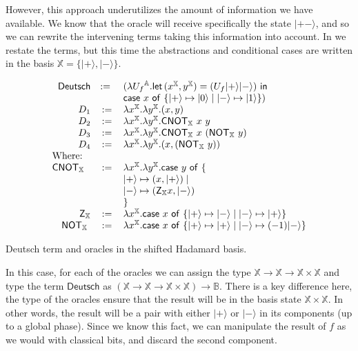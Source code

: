 \documentclass[runningheads,orivec,envcountsame,envcountsect]{llncs}
\newcommand\ket[1]{\ensuremath{|#1\rangle}}
\newcommand\AbsBasis{\ensuremath{\mathbb{A}}}
\def\Pair#1#2{(#1,#2)} %
\def\Lam#1#2#3{\lambda#1^{#2}{.}#3} %
\def\letkeyword{\mathsf{let}}
\def\inkeyword{\mathsf{in}}
\def\LetP#1#2#3#4#5#6{\letkeyword\,\Pair{#1^{#2}}{#3^{#4}}=#5~\inkeyword~#6}
\def\case#1#2#3#4#5{\ensuremath{\mathsf{case}~#1~\mathsf{of}~\{#2\mapsto #4 \mid #3\mapsto #5\}}}
\newcommand\B{\mathbb B}
\newcommand\XB{\mathbb X}
\newcommand{\pauliZXB}{\mathsf{Z}_{\XB}}
\newcommand{\cnotXB}[2]{\mathsf{CNOT}_{\XB}\ #1\ #2}
\newcommand{\pauliXXB}[1]{\mathsf{NOT}_{\XB}\ #1}
\begin{document}
However, this approach underutilizes the amount of information we have available. We know that the oracle will receive specifically the state $\ket{+-}$, and so we can rewrite the intervening terms taking this information into account. In  we restate the terms, but this time the abstractions and conditional cases are written in the basis $\XB=\{\ket{+},\ket{-}\}$.

\begin{table}
    \footnotesize
    \[
    \begin{array}{r c l}
        \mathsf{Deutsch}&:=~&(\Lam{{U_f}}{\AbsBasis}{
                \LetP{x}{\XB}{y}{\XB}
                {(U_f \ket{+} \ket{-})}
                {\\ && \case{x}{\ket{+}}{\ket{-}}{\ket{0}}{\ket{1}}}})\\
        D_1 &:= &\Lam{x}{\XB}{\Lam{y}{\XB}{\Pair{x}{y}}}\\
        D_2 &:= &\Lam{x}{\XB}{\Lam{y}{\XB}{\cnotXB{x}{y}}}\\
        D_3 &:= &\Lam{x}{\XB}{\Lam{y}{\XB}{\cnotXB{x}{(\pauliXXB{y})}}}\\
        D_4 &:= &\Lam{x}{\XB}{\Lam{y}{\XB}{\Pair{x}{(\pauliXXB{y})}}}\\
        \multicolumn{3}{l}{\text{Where:}}\\
        \cnotXB{}{} &:=& \Lam{x}{\XB}{\Lam{y}{\XB}{
        \case{y}
        {\\ && \ket{+}}{\\ && \ket{-}}
        {\Pair{x}{\ket{+}}}{\Pair{\pauliZXB{x}}{\ket{-}} \\ &&}}}\\
        \pauliZXB{} &:=& \Lam{x}{\XB}{\case{x}{\ket{+}}{\ket{-}}{\ket{-}}{\ket{+}}}\\
        \pauliXXB{} &:=& \Lam{x}{\XB}{\case{x}{\ket{+}}{\ket{-}}{\ket{+}}{(-1)\ket{-}}}\\
    \end{array}
    \]
    \caption{Deutsch term and oracles in the shifted Hadamard basis.}
    \label{tab:DeutschShift}
\end{table}

In this case, for each of the oracles we can assign the type $\XB\to\XB\to\XB\times\XB$ and type the term $\mathsf{Deutsch}$ as $(\XB\to\XB\to\XB\times\XB)\to\B$. There is a key difference here, the type of the oracles ensure that the result will be in the basis state $\XB\times\XB$. In other words, the result will be a pair with either $\ket{+}$ or $\ket{-}$ in its components (up to a global phase). Since we know this fact, we can manipulate the result of $f$ as we would with classical bits, and discard the second component. 
\end{document}
